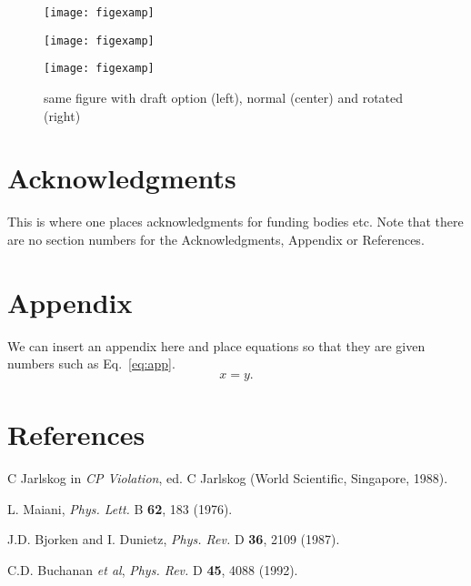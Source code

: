 \documentclass{moriond}
\def\Journal#1#2#3#4{{#1} {\bf #2}, #3 (#4)}
\def\PLB{{\em Phys. Lett.}  B}
\def\PRD{{\em Phys. Rev.} D}
\def\be{\begin{equation}}
\def\ee{\end{equation}}
\begin{document}
\begin{figure}
\begin{minipage}{0.30\linewidth}
\centerline{\texttt{[image: figexamp]}}
\end{minipage}
\hfill
\begin{minipage}{0.30\linewidth}
\centerline{\texttt{[image: figexamp]}}
\end{minipage}
\hfill
\begin{minipage}{0.30\linewidth}
\centerline{\texttt{[image: figexamp]}}
\end{minipage}
\caption[]{same figure with draft option (left), normal (center) and rotated (right)}
\label{fig:radish}
\end{figure}

\section*{Acknowledgments}

This is where one places acknowledgments for funding bodies etc.
Note that there are no section numbers for the Acknowledgments, Appendix
or References.

\section*{Appendix}

 We can insert an appendix here and place equations so that they are
given numbers such as Eq.~\ref{eq:app}.
\be
x = y.
\label{eq:app}
\ee

\section*{References}

\begin{thebibliography}{99}
C Jarlskog in {\em CP Violation}, ed. C Jarlskog
(World Scientific, Singapore, 1988).

L. Maiani, \Journal{\PLB}{62}{183}{1976}.

J.D. Bjorken and I. Dunietz, \Journal{\PRD}{36}{2109}{1987}.

C.D. Buchanan {\it et al}, \Journal{\PRD}{45}{4088}{1992}.

\end{thebibliography}
\end{document}
